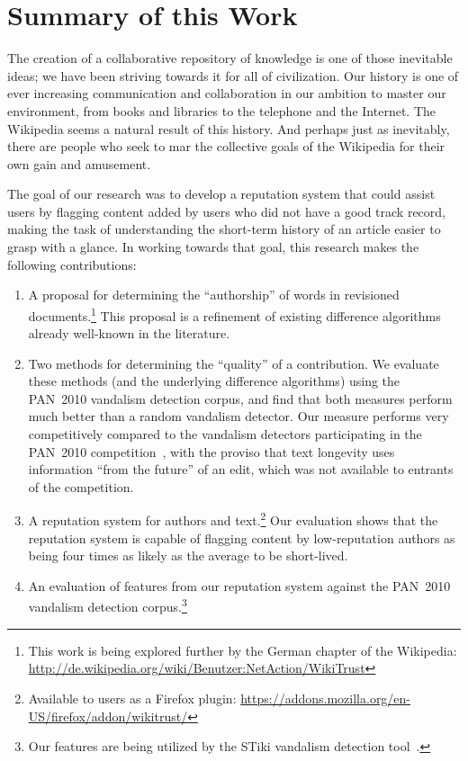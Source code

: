 \section{Summary of this Work}

The creation of a collaborative repository of knowledge is
one of those inevitable ideas; we have been striving towards it
for all of civilization.
Our history is one of ever increasing communication and collaboration
in our ambition to master our environment, from books and libraries
to the telephone and the Internet.
The Wikipedia seems a natural result of this history.
And perhaps just as inevitably, there are people who seek to
mar the collective goals of the Wikipedia for their own gain and amusement.

The goal of our research was to develop a reputation system
that could assist users by flagging content added by users who
did not have a good track record, making the task of understanding
the short-term history of an article easier to grasp with a glance.
In working towards that goal, this research makes the following contributions:
\begin{enumerate}

\item A proposal for determining the ``authorship'' of words in
  revisioned documents.\footnote{This work is being explored further
  by the German chapter of the Wikipedia:
  \url{http://de.wikipedia.org/wiki/Benutzer:NetAction/WikiTrust}}
  This proposal is a refinement of existing difference algorithms
  already well-known in the literature.

\item Two methods for determining the ``quality'' of a contribution.
  We evaluate these methods (and the underlying difference algorithms)
  using the PAN~2010 vandalism detection corpus, and find that both
  measures perform much better than a random vandalism detector.
  Our  measure performs very competitively
  compared to the vandalism detectors participating in the
  PAN~2010 competition~\cite{Potthast2010b}, with the proviso that
  text longevity uses information ``from the future'' of an edit,
  which was not available to entrants of the competition.

\item A reputation system for authors and text.\footnote{Available
  to users as a Firefox plugin:
  \url{https://addons.mozilla.org/en-US/firefox/addon/wikitrust/}}
  Our evaluation shows that the reputation system is capable of
  flagging content by low-reputation authors as being four times
  as likely as the average to be short-lived.

\item An evaluation of features from our reputation system
  against the PAN~2010 vandalism detection
  corpus.\footnote{Our features are being utilized by the
  STiki vandalism detection tool~\cite{wiki:STiki}.}

\end{enumerate}

